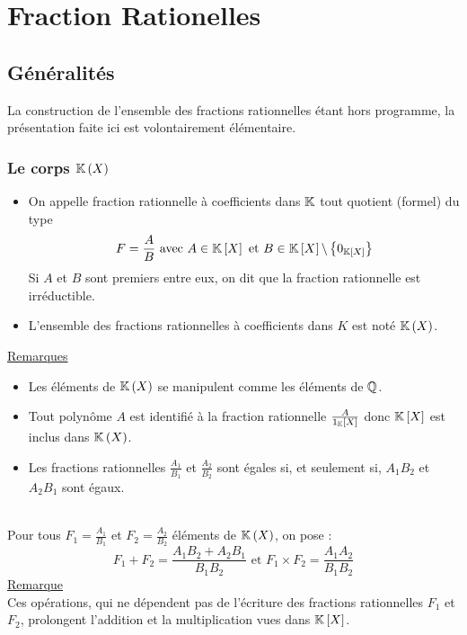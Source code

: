 \chapter{Fraction Rationelles}

\minitoc

\section{Généralités}
La construction de l’ensemble des fractions rationnelles étant hors programme, la présentation faite ici est volontairement élémentaire.
\subsection{Le corps \(\mathbb{K}\left(X\right)\)}
\begin{defi}
    \begin{itemize}
        \item On appelle fraction rationnelle à coefficients dans \(\mathbb{K}\) tout quotient (formel) du type 
        \[F = \frac{A}{B} \text{ avec }A \in \mathbb{K}\left[X\right] \text{ et } B \in \mathbb{K}\left[X\right] \backslash \left\lbrace0_{\mathbb{K}\left[X\right]}\right\rbrace\]
        Si \(A\) et \(B\) sont premiers entre eux, on dit que la fraction rationnelle est irréductible.
        \item L’ensemble des fractions rationnelles à coefficients dans \(K\) est noté \(\mathbb{K}\left(X\right)\).
    \end{itemize}
    \underline{Remarques} \\
    \begin{itemize}
        \item Les éléments de \(\mathbb{K}\left(X\right)\) se manipulent comme les éléments de \(\mathbb{Q}\).
        \item Tout polynôme \(A\) est identifié à la fraction rationnelle \(\frac{A}{1_{\mathbb{K}}\left[X\right]}\) donc \(\mathbb{K} \left[X\right]\)  est inclus dans \(\mathbb{K}\left(X\right)\).
        \item Les fractions rationnelles \(\frac{A_1}{B_1}\) et \(\frac{A_2}{B_2}\) sont égales si, et seulement si, \(A_1B_2\) et \(A_2B_1\) sont égaux.
    \end{itemize}
\end{defi}

\begin{defprop}
    ~\\
    Pour tous \(F_1 = \frac{A_1}{B_1}\) et \(F_2 = \frac{A_2}{B_2}\) éléments de \(\mathbb{K}\left(X\right)\), on pose :
    \[F_1 + F_2 = \frac{A_1B_2 + A_2B_1}{B_1B_2} \text{ et }F_1 \times  F_2 = \frac{A_1A_2}{B_1B_2}\]
    \underline{Remarque} \\
Ces opérations, qui ne dépendent pas de l’écriture des fractions rationnelles \(F_1\) et \(F_2\), prolongent l’addition et la multiplication vues dans \(\mathbb{K}\left[X\right]\).
\end{defprop}

